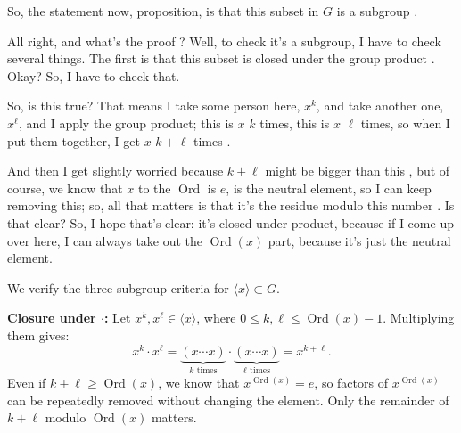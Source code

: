 \begin{speech}[00:04:05 - 00:04:19]
So, the statement now, proposition, is that this subset in $G$ is a subgroup .
\end{speech}

\begin{content}
\end{content}

\begin{proofWrapper}
\begin{speech}[00:04:19 - 00:05:34]
All right, and what's the proof ? Well, to check it's a subgroup, I have to check several things. The first is that this subset is closed under the group product . Okay? So, I have to check that.

So, is this true? That means I take some person here, $x^k$, and take another one, $x^\ell$, and I apply the group product; this is $x$ $k$ times, this is $x$ $\ell$ times, so when I put them together, I get $x$ $k+\ell$ times .

And then I get slightly worried because $k + \ell$ might be bigger than this , but of course, we know that $x$ to the $\operatorname{Ord}$ is $e$, is the neutral element, so I can keep removing this; so, all that matters is that it's the residue modulo this number . Is that clear? So, I hope that's clear: it's closed under product, because if I come up over here, I can always take out the $\operatorname{Ord}(x)$ part, because it's just the neutral element.
\end{speech}

\begin{content}
We verify the three subgroup criteria for $\langle x \rangle \subset G$.

\textbf{Closure under $\cdot$:} Let $x^k, x^\ell \in \langle x \rangle$, where $0 \le k, \ell \le \operatorname{Ord}(x) - 1$. Multiplying them gives:
\[
x^k \cdot x^\ell = \underbrace{(x \cdots x)}_{k \text{ times}} \cdot \underbrace{(x \cdots x)}_{\ell \text{ times}} = x^{k+\ell}.
\]
Even if $k + \ell \ge \operatorname{Ord}(x)$, we know that $x^{\operatorname{Ord}(x)} = e$, so factors of $x^{\operatorname{Ord}(x)}$ can be repeatedly removed without changing the element. Only the remainder of $k + \ell$ modulo $\operatorname{Ord}(x)$ matters.


\end{content}
\end{proofWrapper}
